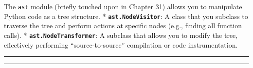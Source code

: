 The \passthrough{\lstinline!ast!} module (briefly touched upon in
Chapter 31) allows you to manipulate Python code as a tree structure. *
\textbf{\passthrough{\lstinline!ast.NodeVisitor!}}: A class that you
subclass to traverse the tree and perform actions at specific nodes
(e.g., finding all function calls). *
\textbf{\passthrough{\lstinline!ast.NodeTransformer!}}: A subclass that
allows you to modify the tree, effectively performing
``source-to-source'' compilation or code instrumentation.

\begin{center}\rule{0.5\linewidth}{0.5pt}\end{center}

\begin{center}\rule{0.5\linewidth}{0.5pt}\end{center}
